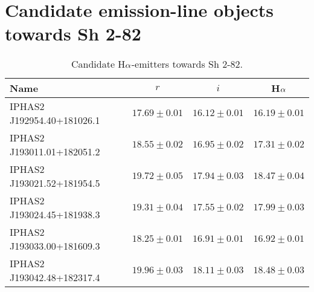 \documentclass[useAMS,usenatbib]{mn2e}
\def\ha{\mbox{H$\rm \alpha$}}
\begin{document}
\section{Candidate emission-line objects towards Sh 2-82}
\label{app:emitters}
\begin{table*}
    \begin{tabular}{lccc}
    \toprule
    Name & $r$ & $i$ & \ha  \\
    \midrule
IPHAS2 J192954.40+181026.1& $17.69\pm0.01$ & $16.12\pm0.01$ & $16.19\pm0.01$ \\
IPHAS2 J193011.01+182051.2& $18.55\pm0.02$ & $16.95\pm0.02$ & $17.31\pm0.02$ \\
IPHAS2 J193021.52+181954.5& $19.72\pm0.05$ & $17.94\pm0.03$ & $18.47\pm0.04$ \\
IPHAS2 J193024.45+181938.3& $19.31\pm0.04$ & $17.55\pm0.02$ & $17.99\pm0.03$ \\
IPHAS2 J193033.00+181609.3& $18.25\pm0.01$ & $16.91\pm0.01$ & $16.92\pm0.01$ \\
IPHAS2 J193042.48+182317.4& $19.96\pm0.03$ & $18.11\pm0.03$ & $18.48\pm0.03$ \\
    \bottomrule
    \end{tabular}
    \caption{Candidate \ha-emitters towards Sh 2-82.}
    \label{tbl:emitters}
\end{table*}

\label{lastpage}
\end{document}
